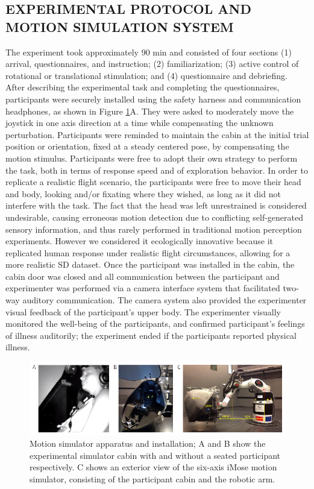 \subsection{EXPERIMENTAL PROTOCOL AND MOTION SIMULATION SYSTEM}
The experiment took approximately 90 min and consisted of four sections (1) arrival, questionnaires, and instruction; (2) familiarization; (3) active control of rotational or translational stimulation; and (4) questionnaire and debriefing. After describing the experimental task and completing the questionnaires, participants were securely installed using the safety harness and communication headphones, as shown in Figure \ref{fig3}A. They were asked to moderately move the joystick in one axis direction at a time while compensating the unknown perturbation. Participants were reminded to maintain the cabin at the initial trial position or orientation, fixed at a steady centered pose, by compensating the motion stimulus. Participants were free to adopt their own strategy to perform the task, both in terms of response speed and of exploration behavior. In order to replicate a realistic flight scenario, the participants were free to move their head and body, looking and/or fixating where they wished, as long as it did not interfere with the task. The fact that the head was left unrestrained is considered undesirable, causing erroneous motion detection due to conflicting self-generated sensory information, and thus rarely performed in traditional motion perception experiments. However we considered it ecologically innovative because it replicated human response under realistic flight circumstances, allowing for a more realistic SD dataset. Once the participant was installed in the cabin, the cabin door was closed and all communication between the participant and experimenter was performed via a camera interface system that facilitated two-way auditory communication. The camera system also provided the experimenter visual feedback of the participant's upper body. The experimenter visually monitored the well-being of the participants, and confirmed participant's feelings of illness auditorily; the experiment ended if the participants reported physical illness.

\begin{figure}[htp]
\begin{center}
\includegraphics[width=1.0\linewidth]{figures/figure3.eps}
\end{center}
\caption{Motion simulator apparatus and installation; A and B show the experimental simulator cabin with and without a seated participant respectively. C shows an exterior view of the six-axis iMose motion simulator, consisting of the participant cabin and the robotic arm.}
\label{fig3}
\end{figure}

